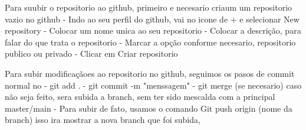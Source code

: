 Para suubir o repositorio ao github, primeiro e necesario criaum um repositorio vazio no github
 - Indo ao seu perfil do github, vai no icone de + e selecionar New repository
 - Colocar um nome unica ao seu repositorio
 - Colocar a descrição, para falar do que trata o repositorio
 - Marcar a opção conforme necesario, repositorio publico ou privado
 - Clicar em Criar repositorio

 
 Para subir modificaçãoes ao repositorio no github, seguimos os pasos de commit normal no
    - git add .
    - git commit -m "menssagem"
    - git merge (se necesario) caso não seja feito, sera subida a branch, sem ter sido mescalda com a principal master/main
    - Para subir de fato, usamos o comando Git push origin (nome da branch)
    isso ira mostrar a nova branch que foi subida, 